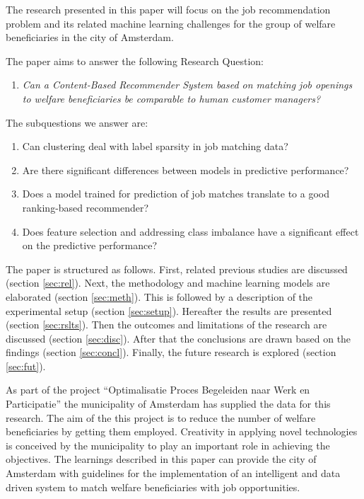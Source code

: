 The research presented in this paper will focus on the job recommendation problem and its related machine learning challenges for the group of welfare beneficiaries in the city of Amsterdam. 

The paper aims to answer the following Research Question:
\begin{enumerate}
    \item \em Can a Content-Based Recommender System based on matching job openings to welfare beneficiaries be comparable to human customer managers? \label{rq:mrq}
\end{enumerate}{}

The subquestions we answer are:
\begin{enumerate}\addtocounter{enumi}{1}
    \item Can clustering deal with label sparsity in job matching data? \label{rq:cold}
    \item Are there significant differences between models in predictive performance? \label{rq:model}
    \item Does a model trained for prediction of job matches translate to a good ranking-based recommender? \label{rq:ranking}
    \item Does feature selection and addressing class imbalance have a significant effect on the predictive performance? \label{rq:strategies}
\end{enumerate}

The paper is structured as follows. First, related previous studies are discussed (section \ref{sec:rel}). Next, the methodology and machine learning models are elaborated (section \ref{sec:meth}). This is followed by a description of the experimental setup (section \ref{sec:setup}). Hereafter the results are presented (section \ref{sec:rslts}). Then the outcomes and limitations of the research are discussed (section \ref{sec:disc}). After that the conclusions are drawn based on the findings (section \ref{sec:concl}). Finally, the future research is explored (section \ref{sec:fut}).

As part of the project “Optimalisatie Proces Begeleiden naar Werk en Participatie” the municipality of Amsterdam has supplied the data for this research. 
The aim of the this project is to reduce the number of welfare beneficiaries by getting them employed.
Creativity in applying novel technologies is conceived by the municipality to play an important role in achieving the objectives.
The learnings described in this paper can provide the city of Amsterdam with guidelines for the implementation of an intelligent and data driven system to match welfare beneficiaries with job opportunities. 



